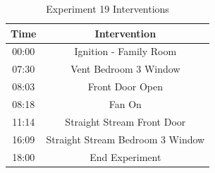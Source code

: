 \documentclass{article}
\begin{document}
\begin{table}[H]
	\centering
	\caption{Experiment 19 Interventions}
	\begin{tabular}{|c|c|} 
		\hline
		Time & Intervention \\ \hline \hline
		00:00 & Ignition - Family Room \\ \hline
		07:30 & Vent Bedroom 3 Window \\ \hline
		08:03 & Front Door Open \\ \hline
		08:18 & Fan On \\ \hline
		11:14 & Straight Stream Front Door \\ \hline
		16:09 & Straight Stream Bedroom 3 Window \\ \hline
		18:00 & End Experiment \\ \hline
	\end{tabular}
	\label{Table:Exp19Interventions}
\end{table}

\clearpage
\end{document}
